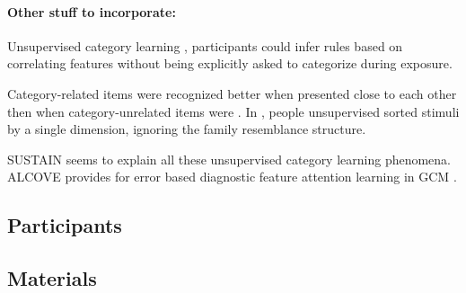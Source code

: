 \paragraph{Other stuff to incorporate:} 

Unsupervised category learning \cite{billman1996unsupervised}, participants could infer rules based on correlating features without being explicitly asked to categorize during exposure. 

Category-related items were recognized better when presented close to each other then when category-unrelated items were \cite{medin1994presentation}. In \cite{medin1987family}, people unsupervised sorted stimuli by a single dimension, ignoring the family resemblance structure. 

SUSTAIN \cite{love2004sustain} seems to explain all these unsupervised category learning phenomena. ALCOVE \cite{kruschke2020alcove} provides for error based diagnostic feature attention learning in GCM \cite{nosofsky2011generalized, nosofsky1986attention}.


\subsection{Participants}


\subsection{Materials}

